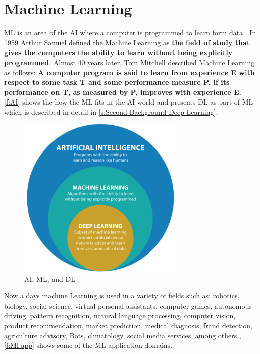 \section{Machine Learning}
\label{s:Second-Background-Topic}

\ac{ML} is an area of the \ac{AI} where a computer is programmed to learn form data \cite{Ray2019}. In 1959 Arthur Samuel defined the Machine Learning as \textbf{the field of study that gives the computers the ability to learn without being explicitly programmed}. Almost 40 years later, Tom Mitchell described Machine Learning as follows: \textbf{A computer program is said to learn from experience E with respect to some task T and some performance measure P, if its performance on T, as measured by P, improves with experience E.} \autoref{f:AI} shows the how the \ac{ML} fits in the \ac{AI} world and presents \ac{DL} as part of \ac{ML} which is described in detail in \autoref{s:Second-Background-Deep-Learning}.

\begin{figure}[h]
\centering
\includegraphics[width=8cm]{figures/Ch2/AI-ML-DL.png}
\caption{AI, ML, and DL \cite{raza_cinquergrana_2018}}
\label{f:AI}
\end{figure}

Now a days machine Learning is used in a variety of fields such as: robotics, biology, social science, virtual personal assistants, computer games, autonomous driving, pattern recognition, natural language processing, computer vision, product recommendation, market prediction, medical diagnosis, fraud detection, agriculture advisory, Bots, climatology, social media services, among others \cite{Srivastava_2019, Shinde_2018, Ray2019}, \autoref{f:Ml-app} shows some of the \ac{ML} application domains. 

